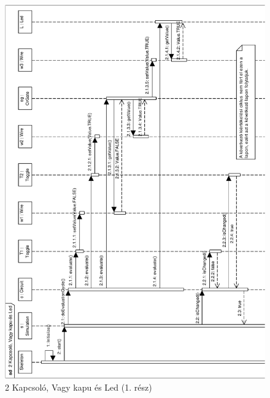 \begin{figure}[H]
\begin{center}
\includegraphics[width=16cm]{chapters/chapter05/imgs/test3-1.pdf}
\caption{2 Kapcsoló, Vagy kapu és Led (1. rész)}
\label{fig:test3_1}
\end{center}
\end{figure}

